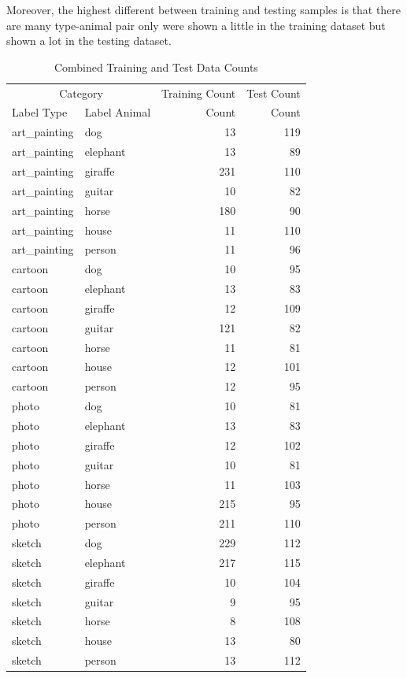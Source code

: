 \documentclass{article}
\begin{document}
Moreover, the highest different between training and testing samples is that there are many type-animal pair only were shown a little in the training dataset but shown a lot in the testing dataset.

\begin{table}[ht]
    \centering
    \caption{Combined Training and Test Data Counts}
    \label{tab:dataset_distribution}
    \begin{tabular}{llrr}
        \toprule
        \multicolumn{2}{c}{Category} & \multicolumn{1}{c}{Training Count} & \multicolumn{1}{c}{Test Count} \\
        \cmidrule(lr){1-2} \cmidrule(lr){3-3} \cmidrule(lr){4-4}
        Label Type & Label Animal & Count & Count \\
        \midrule
        art\_painting & dog & 13 & 119 \\
        art\_painting & elephant & 13 & 89 \\
        art\_painting & giraffe & 231 & 110 \\
        art\_painting & guitar & 10 & 82 \\
        art\_painting & horse & 180 & 90 \\
        art\_painting & house & 11 & 110 \\
        art\_painting & person & 11 & 96 \\
        cartoon & dog & 10 & 95 \\
        cartoon & elephant & 13 & 83 \\
        cartoon & giraffe & 12 & 109 \\
        cartoon & guitar & 121 & 82 \\
        cartoon & horse & 11 & 81 \\
        cartoon & house & 12 & 101 \\
        cartoon & person & 12 & 95 \\
        photo & dog & 10 & 81 \\
        photo & elephant & 13 & 83 \\
        photo & giraffe & 12 & 102 \\
        photo & guitar & 10 & 81 \\
        photo & horse & 11 & 103 \\
        photo & house & 215 & 95 \\
        photo & person & 211 & 110 \\
        sketch & dog & 229 & 112 \\
        sketch & elephant & 217 & 115 \\
        sketch & giraffe & 10 & 104 \\
        sketch & guitar & 9 & 95 \\
        sketch & horse & 8 & 108 \\
        sketch & house & 13 & 80 \\
        sketch & person & 13 & 112 \\
        \bottomrule
    \end{tabular}
    \end{table}
\end{document}
